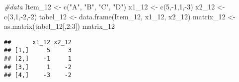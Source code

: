 \documentclass[
]{article}
\newenvironment{Shaded}{\begin{snugshade}}{\end{snugshade}}
\newcommand{\CommentTok}[1]{\textcolor[rgb]{0.56,0.35,0.01}{\textit{#1}}}
\newcommand{\DecValTok}[1]{\textcolor[rgb]{0.00,0.00,0.81}{#1}}
\newcommand{\FunctionTok}[1]{\textcolor[rgb]{0.00,0.00,0.00}{#1}}
\newcommand{\NormalTok}[1]{#1}
\newcommand{\OtherTok}[1]{\textcolor[rgb]{0.56,0.35,0.01}{#1}}
\newcommand{\SpecialCharTok}[1]{\textcolor[rgb]{0.00,0.00,0.00}{#1}}
\newcommand{\StringTok}[1]{\textcolor[rgb]{0.31,0.60,0.02}{#1}}
\begin{document}
\begin{Shaded}
\begin{Highlighting}[]
\CommentTok{\#data}
\NormalTok{Item\_12 }\OtherTok{\textless{}{-}} \FunctionTok{c}\NormalTok{(}\StringTok{"A"}\NormalTok{, }\StringTok{"B"}\NormalTok{, }\StringTok{"C"}\NormalTok{, }\StringTok{"D"}\NormalTok{)}
\NormalTok{x1\_12 }\OtherTok{\textless{}{-}} \FunctionTok{c}\NormalTok{(}\DecValTok{5}\NormalTok{,}\SpecialCharTok{{-}}\DecValTok{1}\NormalTok{,}\DecValTok{1}\NormalTok{,}\SpecialCharTok{{-}}\DecValTok{3}\NormalTok{)}
\NormalTok{x2\_12 }\OtherTok{\textless{}{-}} \FunctionTok{c}\NormalTok{(}\DecValTok{3}\NormalTok{,}\DecValTok{1}\NormalTok{,}\SpecialCharTok{{-}}\DecValTok{2}\NormalTok{,}\SpecialCharTok{{-}}\DecValTok{2}\NormalTok{)}
\NormalTok{tabel\_12 }\OtherTok{\textless{}{-}} \FunctionTok{data.frame}\NormalTok{(Item\_12, x1\_12, x2\_12)}
\NormalTok{matrix\_12 }\OtherTok{\textless{}{-}} \FunctionTok{as.matrix}\NormalTok{(tabel\_12[,}\DecValTok{2}\SpecialCharTok{:}\DecValTok{3}\NormalTok{])}
\NormalTok{matrix\_12}
\end{Highlighting}
\end{Shaded}

\begin{verbatim}
##      x1_12 x2_12
## [1,]     5     3
## [2,]    -1     1
## [3,]     1    -2
## [4,]    -3    -2
\end{verbatim}
\end{document}
